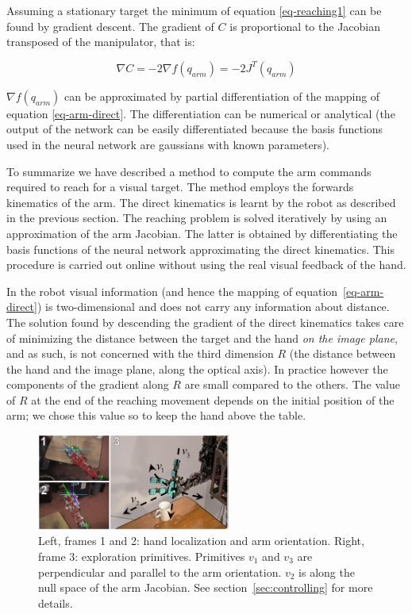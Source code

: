 Assuming a stationary target the minimum of equation \ref{eq-reaching1}
can be found by gradient descent. The gradient of $C$ is proportional
to the Jacobian transposed of the manipulator, that is:

\begin{equation}
  \nabla C=-2\nabla f\left(q_{arm}\right)=-2J^T\left(q_{arm}\right)
\label{eq-gradient}
\end{equation}

$\nabla f\left(q_{arm}\right)$ can be approximated by partial
 differentiation of the mapping of equation \ref{eq-arm-direct}. The
differentiation can be numerical or analytical (the output of the
network can be easily differentiated because the basis functions
used in the neural network are gaussians with known parameters).

To summarize we have described a method to compute the arm
commands required to reach for a visual target. The method employs
the forwards kinematics of the arm. The direct kinematics is
learnt by the robot as described in the previous section. The
reaching problem is solved iteratively by using an approximation
of the arm Jacobian. The latter is obtained by differentiating the
basis functions of the neural network approximating the direct
kinematics. This procedure is carried out online without using the
real visual feedback of the hand.

In the robot visual information (and hence the mapping of equation~\ref{eq-arm-direct})
is two-dimensional and does not carry any information
about distance. The solution found by descending the gradient of the
direct kinematics takes care of minimizing the distance between the target
and the hand \emph{on the image plane}, and as such, is not concerned
with the third dimension $R$ (the distance between the hand and the image
plane, along the optical axis).
In practice however the components of the gradient along $R$ are small
compared to the others. The value of $R$ at the end of the reaching movement
depends on the initial position of the arm; we chose this value so to keep
the hand above the table.


\begin{figure}[tb]
  \centerline{
    \includegraphics[width=2.5in, angle=0 ]{./figures/expl-directions.eps}
  }\caption{Left, frames 1 and 2: hand localization and arm
    orientation. Right, frame 3: exploration primitives. Primitives $v_1$
and $v_3$ are perpendicular and parallel to the arm orientation.
$v_2$ is along the null space of the arm Jacobian. See
section~\ref{sec:controlling} for
 more details.}
\label{fig:expl-directions}
\end{figure}


